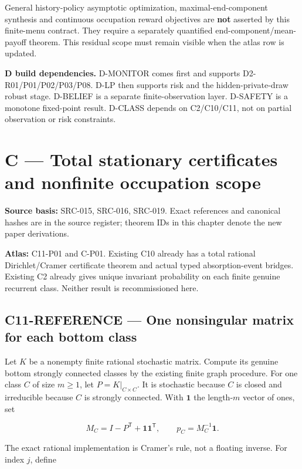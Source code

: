 \documentclass[
  11pt,
  a4paper,
]{article}
\begin{document}
General history-policy asymptotic optimization, maximal-end-component
synthesis and continuous occupation reward objectives are \textbf{not}
asserted by this finite-menu contract. They require a separately
quantified end-component/mean-payoff theorem. This residual scope must
remain visible when the atlas row is updated.

\textbf{D build dependencies.} D-MONITOR comes first and supports
D2-R01/P01/P02/P03/P08. D-LP then supports risk and the
hidden-private-draw robust stage. D-BELIEF is a separate
finite-observation layer. D-SAFETY is a monotone fixed-point result.
D-CLASS depends on C2/C10/C11, not on partial observation or risk
constraints.

\newpage

\section{C --- Total stationary certificates and nonfinite occupation
scope}\label{c-total-stationary-certificates-and-nonfinite-occupation-scope}

\textbf{Source basis:} SRC-015, SRC-016, SRC-019. Exact references and
canonical hashes are in the source register; theorem IDs in this chapter
denote the new paper derivations.

\textbf{Atlas:} C11-P01 and C-P01. Existing C10 already has a total
rational Dirichlet/Cramer certificate theorem and actual typed
absorption-event bridges. Existing C2 already gives unique invariant
probability on each finite genuine recurrent class. Neither result is
recommissioned here.

\subsection{C11-REFERENCE --- One nonsingular matrix for each bottom
class}\label{c11-reference-one-nonsingular-matrix-for-each-bottom-class}

Let \(K\) be a nonempty finite rational stochastic matrix. Compute its
genuine bottom strongly connected classes by the existing finite graph
procedure. For one class \(C\) of size \(m\ge1\), let
\(P=K|_{C\times C}\). It is stochastic because \(C\) is closed and
irreducible because \(C\) is strongly connected. With \(\mathbf1\) the
length-\(m\) vector of ones, set

\[M_C=I-P^{\mathsf T}+\mathbf1\mathbf1^{\mathsf T},\qquad
p_C=M_C^{-1}\mathbf1.\]

The exact rational implementation is Cramer's rule, not a floating
inverse. For index \(j\), define
\end{document}
